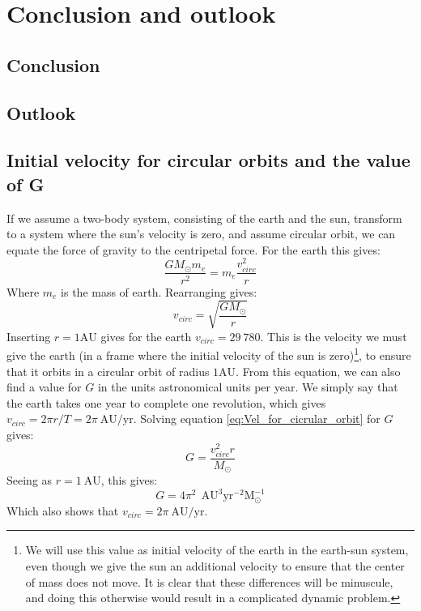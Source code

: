 \documentclass[a4paper, 10pt]{article}
\begin{document}
\section{Conclusion and outlook}
\subsection{Conclusion}
\subsection{Outlook}
\begin{appendices}
\section{Initial velocity for circular orbits and the value of G}\label{ap:Find_Circular_orbit}
If we assume a two-body system, consisting of the earth and the sun, transform to a system where the sun's velocity is zero, and assume circular orbit, we can equate the force of gravity to the centripetal force. For the earth this gives:
$$\frac{GM_{\odot}m_e}{r^2}=m_e\frac{v_{circ}^2}{r}$$
Where $m_e$ is the mass of earth. Rearranging gives:
\begin{equation}\label{eq:Vel_for_cicrular_orbit}
v_{circ}=\sqrt{\frac{GM_{\odot}}{r}}
\end{equation}
Inserting $r=1 \mathrm{AU}$ gives for the earth $v_{circ}=29\ 780$. This is the velocity we must give the earth (in a frame where the initial velocity of the sun is zero)\footnote{We will use this value as initial velocity of the earth in the earth-sun system, even though we give the sun an additional velocity to ensure that the center of mass does not move. It is clear that these differences will be minuscule, and doing this otherwise would result in a complicated dynamic problem.}, to ensure that it orbits in a circular orbit of radius $1 \mathrm{AU}$. 
\linebreak
From this equation, we can also find a value for $G$ in the units astronomical units per year. We simply say that the earth takes one year to complete one revolution, which gives $v_{circ}=2\pi r/T=2\pi \ \mathrm{AU/yr}$. Solving equation \ref{eq:Vel_for_cicrular_orbit} for $G$ gives:
$$G=\frac{v_{circ}^2 r}{M_{\odot}}$$
Seeing as  $r=1 \ \mathrm{AU}$, this gives:
$$G=4\pi^2\ \ \mathrm{AU^3}\mathrm{yr^{-2}M_{\odot}^{-1}}$$
Which also shows that $v_{circ}=2\pi \ \mathrm{AU/yr}$.

\end{appendices}
\end{document}
